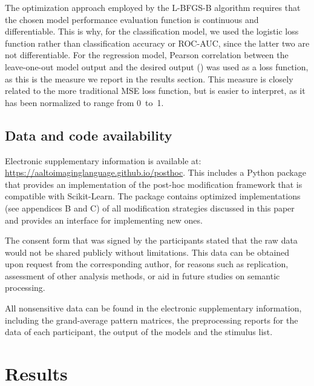 \documentclass[a4paper]{vanvliet_paper}
\begin{document}
The optimization approach employed by the \gls{L-BFGS-B} algorithm requires that the chosen model performance evaluation function is continuous and differentiable.
This is why, for the classification model, we used the logistic loss function rather than classification accuracy or \gls{ROC-AUC}, since the latter two are not differentiable.
For the regression model, Pearson correlation between the leave-one-out model output and the desired output () was used as a loss function, as this is the measure we report in the results section.
This measure is closely related to the more traditional \gls{MSE} loss function, but is easier to interpret, as it has been normalized to range from 0~to~1.


\subsection{Data and code availability}\label{sec:data}

Electronic supplementary information is available at: \url{https://aaltoimaginglanguage.github.io/posthoc}.
This includes a Python package that provides an implementation of the post-hoc modification framework that is compatible with Scikit-Learn\cite{Pedregosa2012}.
The package contains optimized implementations (see appendices B and C) of all modification strategies discussed in this paper and provides an interface for implementing new ones.

The consent form that was signed by the participants stated that the raw data would not be shared publicly without limitations.
This data can be obtained upon request from the corresponding author, for reasons such as replication, assessment of other analysis methods, or aid in future studies on semantic processing.

All nonsensitive data can be found in the electronic supplementary information, including the grand-average pattern matrices, the preprocessing reports for the data of each participant, the output of the models and the stimulus list.

\section{Results}
\end{document}
